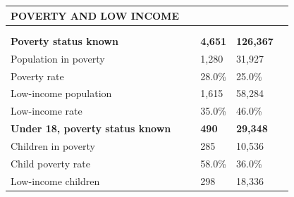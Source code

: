 \documentclass[9pt]{report}
\begin{document}
\vspace{12pt}
\setlength{\tabcolsep}{.01in} %
\begin{tabular}{p{.10in}p{.10in}p{.10in}p{3.7in}>{\hfill}p{.85in}>{\hfill}p{.85in}>{\hfill}p{.85in}>{\hfill}p{.85in}p{0.1in}}
\multicolumn{9}{l}{\parbox{7.1in}{\raggedright{\large{\strut\textbf{POVERTY AND LOW INCOME}\strut}}}} \\ 
\hline
\multicolumn{4}{l}{\parbox{3.5in}{\raggedright{\textbf{}}}} & \multicolumn{1}{r}{\parbox{.85in}{\strut\raggedleft{\textbf{}\strut}}} & \multicolumn{1}{r}{\parbox{.85in}{\strut\raggedleft{\textbf{}\strut}}} & \multicolumn{1}{r}{\parbox{.85in}{\strut{}}} & \multicolumn{1}{r}{\parbox{.85in}{\strut{}}} & \\ 
\multicolumn{9}{l}{} \\ 
\multicolumn{4}{l}{\parbox{3.5in}{\strut\raggedright{\textbf{Poverty status known}\strut}}} & \textbf{} & \textbf{} & \textbf{4,651} & \textbf{126,367} & \textbf{} \\ 
\multicolumn{4}{l}{\parbox{3.6in}{\strut\raggedright{{Population in poverty}}\strut}} &  &  & 1,280 & 31,927 & \multicolumn{1}{l}{}  \\ 
\multicolumn{4}{l}{\parbox{3.6in}{\strut\raggedright{{Poverty rate}}\strut}} &  &  & 28.0\% & 25.0\% & \multicolumn{1}{l}{}  \\ 
\multicolumn{4}{l}{\parbox{3.6in}{\strut\raggedright{{Low-income population}}\strut}} &  &  & 1,615 & 58,284 & \multicolumn{1}{l}{}  \\ 
\multicolumn{4}{l}{\parbox{3.6in}{\strut\raggedright{{Low-income rate}}\strut}} &  &  & 35.0\% & 46.0\% & \multicolumn{1}{l}{}  \\ 
\multicolumn{4}{l}{\parbox{3.5in}{\strut\raggedright{\textbf{Under 18, poverty status known}\strut}}} & \textbf{} & \textbf{} & \textbf{490} & \textbf{29,348} & \textbf{} \\ 
\multicolumn{4}{l}{\parbox{3.6in}{\strut\raggedright{{Children in poverty}}\strut}} &  &  & 285 & 10,536 & \multicolumn{1}{l}{}  \\ 
\multicolumn{4}{l}{\parbox{3.6in}{\strut\raggedright{{Child poverty rate}}\strut}} &  &  & 58.0\% & 36.0\% & \multicolumn{1}{l}{}  \\ 
\multicolumn{4}{l}{\parbox{3.6in}{\strut\raggedright{{Low-income children}}\strut}} &  &  & 298 & 18,336 & \multicolumn{1}{l}{}  \\ 

\end{tabular}
\end{document}
